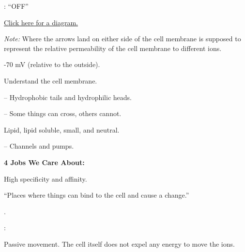\begin{coloredlist}
    \item {}: ``OFF'' 
    \begin{coloredlist}
        \item \hyperref[resting potential]{Click here for a diagram.}
        \item \textit{Note:} Where the arrows land on either side of the cell membrane is supposed to represent the relative permeability of the cell membrane to different ions.
        \item -70 mV (relative to the outside).
        \item Understand the cell membrane.
        \begin{coloredlist}
            \item {} -- Hydrophobic tails and hydrophilic heads.
            \item {} -- Some things can cross, others cannot.
            \begin{coloredlist}
                \item Lipid, lipid soluble, small, and neutral.
            \end{coloredlist}
            \item {} -- Channels and pumps. 
            \begin{coloredlist}
                \item \textbf{4 Jobs We Care About:}
                \begin{coloredlist}
                    \item {}
                    \begin{coloredlist}
                        \item High specificity and affinity.
                        \item ``Places where things can bind to the cell and cause a change.''
                    \end{coloredlist}
                    \item {}.
                    \begin{coloredlist}
                        \item {}: 
                        \begin{coloredlist}
                            \item Passive movement. The cell itself does not expel any energy to move the ions.

\end{coloredlist}
\end{coloredlist}
\end{coloredlist}
\end{coloredlist}
\end{coloredlist}
\end{coloredlist}
\end{coloredlist}
